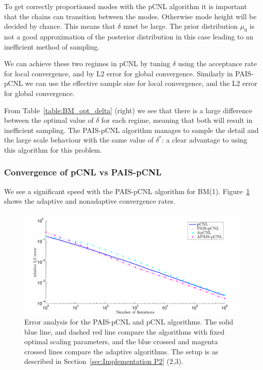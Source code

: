 \documentclass[final]{siamltex}
\begin{document}
To get correctly proportioned modes with the pCNL algorithm it is important that the chains can transition between the modes. Otherwise mode height will be decided by chance. This means that $\delta$ must be large. The prior distribution $\mu_0$ is not a good approximation of the posterior distribution in this case leading to an inefficient method of sampling.

We can achieve these two regimes in pCNL by tuning $\delta$ using the acceptance rate for local convergence, and by L2 error for global convergence. Similarly in PAIS-pCNL we can use the effective sample size for local convergence, and the L2 error for global convergence.

From Table~\ref{table:BM_opt_delta} (right) we see that there is a large difference between the optimal value of $\delta$ for each regime, meaning that both will result in inefficient sampling. The PAIS-pCNL algorithm manages to sample the detail and the large scale behaviour with the same value of $\delta^*$: a clear advantage to using this algorithm for this problem.

\subsubsection{Convergence of pCNL vs PAIS-pCNL}

We see a significant speed with the PAIS-pCNL algorithm for BM(1). Figure~\ref{fig:BM1_L2} shows the adaptive and nonadaptive convergence rates. 

\begin{figure}[htpb]
\begin{center}
\includegraphics[width=\textwidth]{"figures/BM1_L2"}
\caption{Error analysis for the PAIS-pCNL and pCNL algorithms. The solid blue line, and dashed red line compare the algorithms with fixed optimal scaling parameters, and the blue crossed and magenta crossed lines compare the adaptive algorithms. The setup is as described in Section~\ref{sec:Implementation P2} (2,3).}
\label{fig:BM1_L2}
\end{center}
\end{figure}
\end{document}

